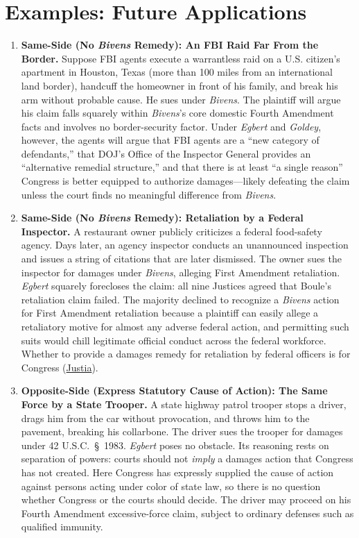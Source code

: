 \documentclass[12pt]{article}
\begin{document}
\section{Examples: Future Applications}
\begin{enumerate}

\item \textbf{Same-Side (No \textit{Bivens} Remedy): An FBI Raid Far From the Border.} Suppose FBI agents execute a warrantless raid on a U.S. citizen's apartment in Houston, Texas (more than 100 miles from an international land border), handcuff the homeowner in front of his family, and break his arm without probable cause. He sues under \textit{Bivens}. The plaintiff will argue his claim falls squarely within \textit{Bivens}'s core domestic Fourth Amendment facts and involves no border-security factor. Under \textit{Egbert} and \textit{Goldey}, however, the agents will argue that FBI agents are a ``new category of defendants,'' that DOJ's Office of the Inspector General provides an ``alternative remedial structure,'' and that there is at least ``a single reason'' Congress is better equipped to authorize damages---likely defeating the claim unless the court finds no meaningful difference from \textit{Bivens}.

\item \textbf{Same-Side (No \textit{Bivens} Remedy): Retaliation by a Federal Inspector.} A restaurant owner publicly criticizes a federal food-safety agency. Days later, an agency inspector conducts an unannounced inspection and issues a string of citations that are later dismissed. The owner sues the inspector for damages under \textit{Bivens}, alleging First Amendment retaliation. \textit{Egbert} squarely forecloses the claim: all nine Justices agreed that Boule's retaliation claim failed. The majority declined to recognize a \textit{Bivens} action for First Amendment retaliation because a plaintiff can easily allege a retaliatory motive for almost any adverse federal action, and permitting such suits would chill legitimate official conduct across the federal workforce. Whether to provide a damages remedy for retaliation by federal officers is for Congress (\href{https://supreme.justia.com/cases/federal/us/596/21-147/}{Justia}).

\item \textbf{Opposite-Side (Express Statutory Cause of Action): The Same Force by a State Trooper.} A state highway patrol trooper stops a driver, drags him from the car without provocation, and throws him to the pavement, breaking his collarbone. The driver sues the trooper for damages under 42 U.S.C.\ \S~1983. \textit{Egbert} poses no obstacle. Its reasoning rests on separation of powers: courts should not \emph{imply} a damages action that Congress has not created. Here Congress has expressly supplied the cause of action against persons acting under color of state law, so there is no question whether Congress or the courts should decide. The driver may proceed on his Fourth Amendment excessive-force claim, subject to ordinary defenses such as qualified immunity.


\end{enumerate}
\end{document}
